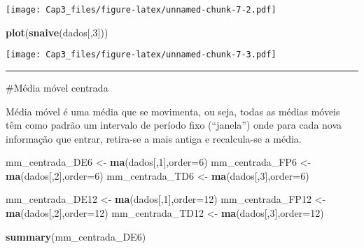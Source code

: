 \documentclass[]{article}
\newenvironment{Shaded}{\begin{snugshade}}{\end{snugshade}}
\newcommand{\DataTypeTok}[1]{\textcolor[rgb]{0.13,0.29,0.53}{#1}}
\newcommand{\DecValTok}[1]{\textcolor[rgb]{0.00,0.00,0.81}{#1}}
\newcommand{\KeywordTok}[1]{\textcolor[rgb]{0.13,0.29,0.53}{\textbf{#1}}}
\newcommand{\NormalTok}[1]{#1}
\newcommand{\StringTok}[1]{\textcolor[rgb]{0.31,0.60,0.02}{#1}}
\begin{document}
\texttt{[image: Cap3\_files/figure-latex/unnamed-chunk-7-2.pdf]}

\begin{Shaded}
\begin{Highlighting}[]
\KeywordTok{plot}\NormalTok{(}\KeywordTok{snaive}\NormalTok{(dados[,}\DecValTok{3}\NormalTok{]))}
\end{Highlighting}
\end{Shaded}

\texttt{[image: Cap3\_files/figure-latex/unnamed-chunk-7-3.pdf]}

\begin{center}\rule{0.5\linewidth}{\linethickness}\end{center}

\#Média móvel centrada

Média móvel é uma média que se movimenta, ou seja, todas as médias
móveis têm como padrão um intervalo de período fixo (``janela'') onde
para cada nova informação que entrar, retira-se a mais antiga e
recalcula-se a média.

\begin{Shaded}
\begin{Highlighting}[]
\NormalTok{mm_centrada_DE6 <-}\StringTok{ }\KeywordTok{ma}\NormalTok{(dados[,}\DecValTok{1}\NormalTok{],}\DataTypeTok{order=}\DecValTok{6}\NormalTok{)}
\NormalTok{mm_centrada_FP6 <-}\StringTok{ }\KeywordTok{ma}\NormalTok{(dados[,}\DecValTok{2}\NormalTok{],}\DataTypeTok{order=}\DecValTok{6}\NormalTok{)}
\NormalTok{mm_centrada_TD6 <-}\StringTok{ }\KeywordTok{ma}\NormalTok{(dados[,}\DecValTok{3}\NormalTok{],}\DataTypeTok{order=}\DecValTok{6}\NormalTok{)}
\end{Highlighting}
\end{Shaded}

\begin{Shaded}
\begin{Highlighting}[]
\NormalTok{mm_centrada_DE12 <-}\StringTok{ }\KeywordTok{ma}\NormalTok{(dados[,}\DecValTok{1}\NormalTok{],}\DataTypeTok{order=}\DecValTok{12}\NormalTok{)}
\NormalTok{mm_centrada_FP12 <-}\StringTok{ }\KeywordTok{ma}\NormalTok{(dados[,}\DecValTok{2}\NormalTok{],}\DataTypeTok{order=}\DecValTok{12}\NormalTok{)}
\NormalTok{mm_centrada_TD12 <-}\StringTok{ }\KeywordTok{ma}\NormalTok{(dados[,}\DecValTok{3}\NormalTok{],}\DataTypeTok{order=}\DecValTok{12}\NormalTok{)}
\end{Highlighting}
\end{Shaded}

\begin{Shaded}
\begin{Highlighting}[]
\KeywordTok{summary}\NormalTok{(mm_centrada_DE6)}
\end{Highlighting}
\end{Shaded}
\end{document}
